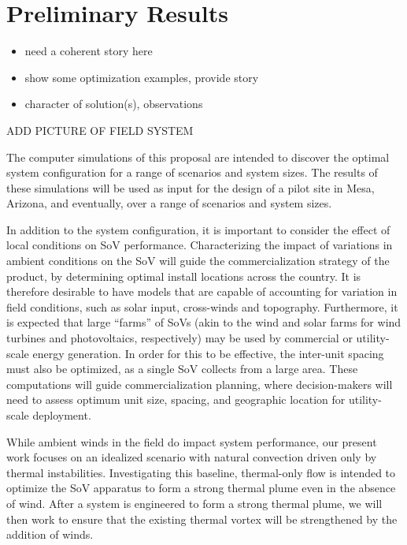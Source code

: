  
\section{Preliminary Results}
\label{sec:results}

\begin{itemize}
\item need a coherent story here
\item show some optimization examples, provide story
\item character of solution(s), observations
\end{itemize}

ADD PICTURE OF FIELD SYSTEM 

The computer simulations of this proposal are intended to discover the
optimal system configuration for a range of scenarios and system sizes. The
results of these simulations will be used as input for the design of a
pilot site in Mesa, Arizona, and eventually, over a range of
scenarios and system sizes. 


In addition to the system configuration, it is important to consider the
effect of local conditions on SoV performance. Characterizing the impact
of variations in ambient conditions on the SoV will guide the
commercialization strategy of the product, by determining optimal
install locations across the country. It is therefore desirable to have models
that are capable of accounting for variation in field conditions, such
as solar input, cross-winds and topography. Furthermore, it is expected
that large ``farms'' of SoVs (akin to the wind and solar farms for wind
turbines and photovoltaics, respectively) may be used by commercial or
utility-scale energy generation. In order for this to be effective, 
the inter-unit spacing must also be optimized, as a single SoV collects
from a large area. These computations will guide commercialization
planning, where decision-makers will need to assess optimum unit size,
spacing, and geographic location for utility-scale deployment.  



While ambient winds in the field do impact system performance, our
present work focuses on an idealized scenario with natural convection
driven only by thermal instabilities. Investigating this baseline,
thermal-only flow is intended to optimize the SoV apparatus to form a
strong  thermal plume even in the absence of wind. After a system is
engineered to form a strong thermal plume, we will then work to ensure
that the existing thermal vortex will be strengthened by the addition of
winds.     


